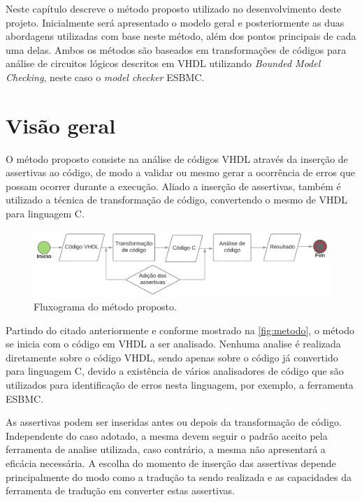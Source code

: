 \label{chapter:metodo}
\par
Neste capítulo descreve o método proposto utilizado no desenvolvimento deste projeto. Inicialmente será apresentado o modelo geral e posteriormente as duas abordagens utilizadas com base neste método, além dos pontos principais de cada uma delas. Ambos os métodos são baseados em transformações de códigos para análise de circuitos lógicos descritos em VHDL utilizando 
\textit{Bounded Model Checking}, neste caso o \textit{model checker} ESBMC.

\section{Visão geral}

\par
O método proposto consiste na análise de códigos VHDL através da inserção de assertivas ao código, de modo a validar ou mesmo gerar a ocorrência de erros que possam ocorrer durante a execução. Aliado a inserção de assertivas, também é utilizado a técnica de transformação de código, convertendo o mesmo de VHDL para linguagem C. 

\begin{figure}[H]
	\begin{center}
    \caption{\label{fig:metodo} Fluxograma do método proposto.}
	\includegraphics[scale=0.32]{Figuras/Fluxo_metodo.png}
	\end{center}
\end{figure}

\par
Partindo do citado anteriormente e conforme mostrado na \autoref{fig:metodo}, o método se inicia com o código em VHDL a ser analisado. Nenhuma analise é realizada diretamente sobre o código VHDL, sendo apenas sobre o código já convertido para linguagem C, devido a existência de vários analisadores de código que são utilizados para identificação de erros nesta linguagem, por exemplo, a ferramenta ESBMC. 

\par
As assertivas podem ser inseridas antes ou depois da transformação de código. Independente do caso adotado, a mesma devem seguir o padrão aceito pela ferramenta de analise utilizada, caso contrário, a mesma não apresentará a eficácia necessária. A escolha do momento de inserção das assertivas depende principalmente do modo como a tradução ta sendo realizada e as capacidades da ferramenta de tradução em converter estas assertivas.

